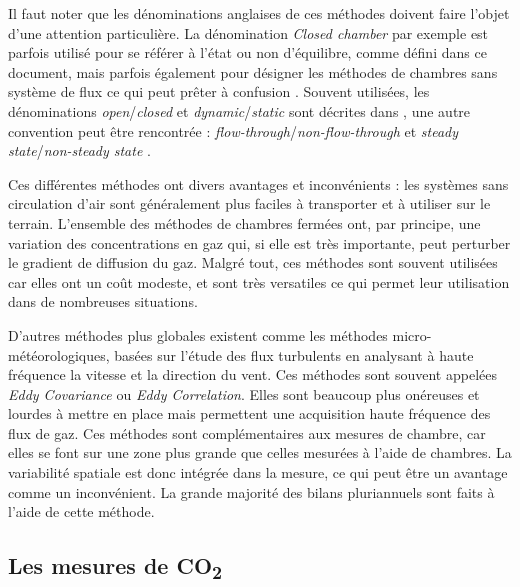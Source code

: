 Il faut noter que les dénominations anglaises de ces méthodes doivent faire l'objet d'une attention particulière.
La dénomination \textit{Closed chamber} par exemple est parfois utilisé pour se référer à l'état ou non d'équilibre, comme défini dans ce document, mais parfois également pour désigner les méthodes de chambres sans système de flux ce qui peut prêter à confusion \citep{pumpanen2004}.
Souvent utilisées, les dénominations \textit{open}/\textit{closed} et \textit{dynamic}/\textit{static} sont décrites dans \citet{luo2006161}, une autre convention peut être rencontrée : \textit{flow-through}/\textit{non-flow-through} et \textit{steady state}/\textit{non-steady state} \citep{livingston1995}.

Ces différentes méthodes ont divers avantages et inconvénients : les systèmes sans circulation d'air sont généralement plus faciles à transporter et à utiliser sur le terrain.
L'ensemble des méthodes de chambres fermées ont, par principe, une variation des concentrations en gaz qui, si elle est très importante, peut perturber le gradient de diffusion du gaz.
Malgré tout, ces méthodes sont souvent utilisées car elles ont un coût modeste, et sont très versatiles ce qui permet leur utilisation dans de nombreuses situations.

D'autres méthodes plus globales existent comme les méthodes micro-météorologiques, basées sur l'étude des flux turbulents en analysant à haute fréquence la vitesse et la direction du vent.
Ces méthodes sont souvent appelées \textit{Eddy Covariance} ou \textit{Eddy Correlation}.
Elles sont beaucoup plus onéreuses et lourdes à mettre en place mais permettent une acquisition haute fréquence des flux de gaz.
Ces méthodes sont complémentaires aux mesures de chambre, car elles se font sur une zone plus grande que celles mesurées à l'aide de chambres.
La variabilité spatiale est donc intégrée dans la mesure, ce qui peut être un avantage comme un inconvénient.
La grande majorité des bilans pluriannuels sont faits à l'aide de cette méthode.


\subsection{Les mesures de \texorpdfstring{CO\textsubscript{2}}{CO2}}
\label{subsec:ss_mes_co2}

